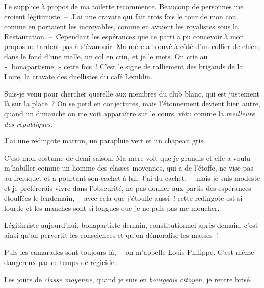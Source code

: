\documentclass[french,twoside]{book} %
\def\mednobreak{\ifdim\lastskip<\medskipamount
  \removelastskip\nopagebreak\medskip\fi}
\newcommand{\labelblock}[1]{\medbreak{\noindent\color{rubric}\bfseries #1}\par\mednobreak}
\begin{document}
\noindent Le supplice à propos de ma toilette recommence. Beaucoup de personnes me croient légitimiste. – J’ai une cravate qui fait trois fois le tour de mon cou, comme en portaient les incroyables, comme en avaient les royalistes sous la Restauration. – Cependant les espérances que ce parti a pu concevoir à mon propos ne tardent pas à s’évanouir. Ma mère a trouvé à côté d’un collier de chien, dans le fond d’une malle, un col en crin, et je le mets. On crie au « bonapartisme » cette fois ! C’est le signe de ralliement des brigands de la Loire, la cravate des duellistes du café Lemblin.\par
Suis-je venu pour chercher querelle aux membres du club blanc, qui est justement là sur la place ? On se perd en conjectures, mais l’étonnement devient bien autre, quand un dimanche on me voit apparaître sur le cours, vêtu comme la \emph{meilleure des républiques}.\par
J’ai une redingote marron, un parapluie vert et un chapeau gris.\par
C’est mon costume de demi-saison. Ma mère voit que je grandis et elle a voulu m’habiller comme un homme des classes moyennes, qui a de l’étoffe, ne vise pas au freluquet et a pourtant son cachet à lui. J’ai du cachet, – mais je suis modeste et je préférerais vivre dans l’obscurité, ne pas donner aux partis des espérances étouffées le lendemain, – avec cela que j’étouffe aussi ! cette redingote est si lourde et les manches sont si longues que je ne puis pas me moucher.\par
Légitimiste aujourd’hui, bonapartiste demain, constitutionnel après-demain, c’est ainsi qu’on pervertit les consciences et qu’on démoralise les masses !\par
Puis les camarades sont toujours là, – on m’appelle Louis-Philippe. C’est même dangereux par ce temps de régicide.\par
Les jours de \emph{classe moyenne}, quand je suis en \emph{bourgeois citoyen}, je rentre brisé.\par

\labelblock{NOS BONNES}
\end{document}
